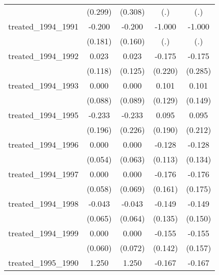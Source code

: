 {\begin{tabular}{l*{4}{c}}
            &     (0.299)         &     (0.308)         &         (.)         &         (.)         \\
[1em]
treated\_1994\_1991&      -0.200         &      -0.200         &      -1.000         &      -1.000         \\
            &     (0.181)         &     (0.160)         &         (.)         &         (.)         \\
[1em]
treated\_1994\_1992&       0.023         &       0.023         &      -0.175         &      -0.175         \\
            &     (0.118)         &     (0.125)         &     (0.220)         &     (0.285)         \\
[1em]
treated\_1994\_1993&       0.000         &       0.000         &       0.101         &       0.101         \\
            &     (0.088)         &     (0.089)         &     (0.129)         &     (0.149)         \\
[1em]
treated\_1994\_1995&      -0.233         &      -0.233         &       0.095         &       0.095         \\
            &     (0.196)         &     (0.226)         &     (0.190)         &     (0.212)         \\
[1em]
treated\_1994\_1996&       0.000         &       0.000         &      -0.128         &      -0.128         \\
            &     (0.054)         &     (0.063)         &     (0.113)         &     (0.134)         \\
[1em]
treated\_1994\_1997&       0.000         &       0.000         &      -0.176         &      -0.176         \\
            &     (0.058)         &     (0.069)         &     (0.161)         &     (0.175)         \\
[1em]
treated\_1994\_1998&      -0.043         &      -0.043         &      -0.149         &      -0.149         \\
            &     (0.065)         &     (0.064)         &     (0.135)         &     (0.150)         \\
[1em]
treated\_1994\_1999&       0.000         &       0.000         &      -0.155         &      -0.155         \\
            &     (0.060)         &     (0.072)         &     (0.142)         &     (0.157)         \\
[1em]
treated\_1995\_1990&       1.250\sym{***}&       1.250\sym{***}&      -0.167         &      -0.167         \\

\end{tabular}}
